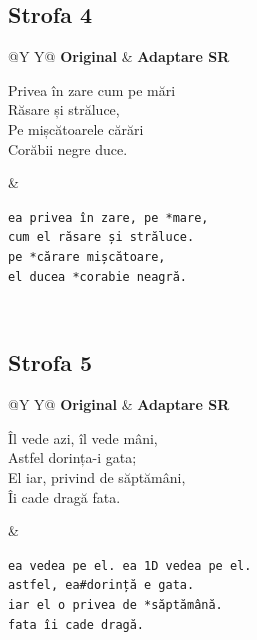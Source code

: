 \documentclass[12pt,onecolumn,letterpaper]{article}
\newcommand{\rs}[1]{\texttt{#1}}
\begin{document}
\subsection*{Strofa 4}
\noindent
\begin{tabularx}{\linewidth}{@{}Y Y@{}}
\textbf{Original} & \textbf{Adaptare SR} \\
\begin{minipage}[t]{\linewidth}\vspace{0pt}
Privea în zare cum pe mări\\
Răsare și străluce,\\
Pe mișcătoarele cărări\\
Corăbii negre duce.
\end{minipage}
&
\begin{minipage}[t]{\linewidth}\vspace{0pt}
\rs{ea privea în zare, pe *mare,}\\
\rs{cum el răsare și străluce.}\\
\rs{pe *cărare mișcătoare,}\\
\rs{el ducea *corabie neagră.}
\end{minipage}
\\
\end{tabularx}

\subsection*{Strofa 5}
\noindent
\begin{tabularx}{\linewidth}{@{}Y Y@{}}
\textbf{Original} & \textbf{Adaptare SR} \\
\begin{minipage}[t]{\linewidth}\vspace{0pt}
Îl vede azi, îl vede mâni,\\
Astfel dorința-i gata;\\
El iar, privind de săptămâni,\\
Îi cade dragă fata.
\end{minipage}
&
\begin{minipage}[t]{\linewidth}\vspace{0pt}
\rs{ea vedea pe el. ea 1D vedea pe el.}\\
\rs{astfel, ea\#dorință e gata.}\\
\rs{iar el o privea de *săptămână.}\\
\rs{fata îi cade dragă.}
\end{minipage}
\\
\end{tabularx}
\end{document}
